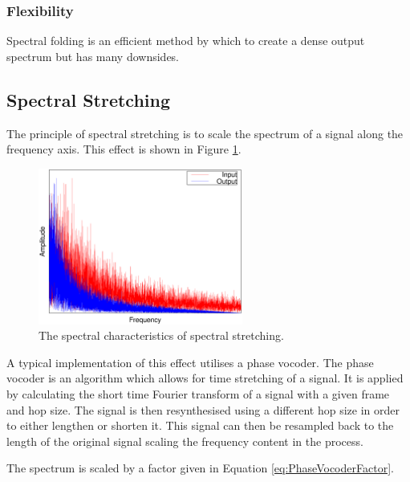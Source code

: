 		\subsubsection*{Flexibility}
			Spectral folding is an efficient method by which to create a dense output spectrum but has many
			downsides.


	\subsection{Spectral Stretching}
	\label{sec:Excitation-SpectralStretching}
		The principle of spectral stretching is to scale the spectrum of a signal along the frequency axis. This
		effect is shown in Figure \ref{fig:SpectralStretching}.

		\begin{figure}[h!]
			\centering
			\includegraphics[width=0.6\textwidth]{chapter3/Images/SpectralStretchingSpectrum.eps}
			\caption{The spectral characteristics of spectral stretching.}
			\label{fig:SpectralStretching}
		\end{figure}

		A typical implementation of this effect utilises a phase vocoder. The phase vocoder is an algorithm which
		allows for time stretching of a signal. It is applied by calculating the short time Fourier transform of a
		signal with a given frame and hop size. The signal is then resynthesised using a different hop size in
		order to either lengthen or shorten it. This signal can then be resampled back to the length of the
		original signal scaling the frequency content in the process. 
		
		The spectrum is scaled by a factor given in Equation \ref{eq:PhaseVocoderFactor}.

